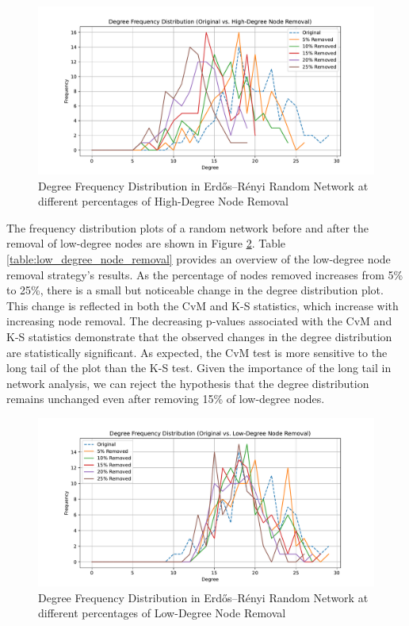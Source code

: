 \documentclass[conference]{IEEEtran} %
\begin{document}
\begin{figure}[t]
  \centering
  \includegraphics[width=1.1\linewidth]{random_network_frequency_distribution_plot_High-Degree Node Removal.pdf}
  \caption{Degree Frequency Distribution in Erdős–Rényi Random Network at different percentages of High-Degree Node Removal}
  \label{fig:13.1}
\end{figure}


The frequency distribution plots of a random network before and after the removal of low-degree nodes are shown in Figure \ref{fig:13.2}. Table \ref{table:low_degree_node_removal} provides an overview of the low-degree node removal strategy's results. As the percentage of nodes removed increases from 5\% to 25\%, there is a small but noticeable change in the degree distribution plot. This change is reflected in both the CvM and K-S statistics, which increase with increasing node removal. The decreasing p-values associated with the CvM and K-S statistics demonstrate that the observed changes in the degree distribution are statistically significant. As expected, the CvM test is more sensitive to the long tail of the plot than the K-S test. Given the importance of the long tail in network analysis, we can reject the hypothesis that the degree distribution remains unchanged even after removing 15\% of low-degree nodes.

\begin{figure}[t]
  \centering
  \includegraphics[width = 1.1\linewidth]{random_network_frequency_distribution_plot_Low-Degree Node Removal.pdf}
  \caption{Degree Frequency Distribution in Erdős–Rényi Random Network at different percentages of Low-Degree Node Removal}
  \label{fig:13.2}
\end{figure}
\end{document}
